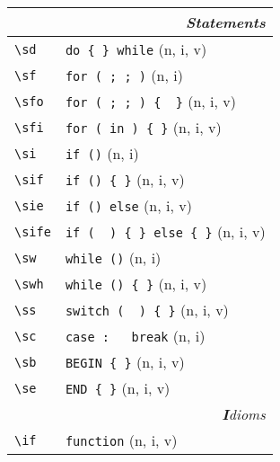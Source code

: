 \documentclass[oneside,10pt,landscape,DIV16]{scrartcl}
\begin{document}
\begin{multicols}{3}
\begin{center}
%
%
\begin{tabular}[]{|p{11mm}|p{60mm}|}
\hline
\multicolumn{2}{|r|}{\textsl{\textbf{S}tatements}}                    \\[1.0ex]
\hline \verb'\sd'      & \verb'do { } while'          \hfill (n, i, v)\\
\hline \verb'\sf'      & \verb'for ( ; ; )'           \hfill (n, i)\\
\hline \verb'\sfo'     & \verb'for ( ; ; ) {  }'      \hfill (n, i, v)\\
\hline \verb'\sfi'     & \verb'for ( in ) { }'        \hfill (n, i, v)\\
\hline \verb'\si'      & \verb'if ()'                 \hfill (n, i)\\
\hline \verb'\sif'     & \verb'if () { }'             \hfill (n, i, v)\\
\hline \verb'\sie'     & \verb'if () else'            \hfill (n, i, v)\\
\hline \verb'\sife'    & \verb'if (  ) { } else { }'  \hfill (n, i, v)\\
\hline \verb'\sw'      & \verb'while ()'              \hfill (n, i)\\
\hline \verb'\swh'     & \verb'while () { }'          \hfill (n, i, v)\\
\hline \verb'\ss'      & \verb'switch (  ) { }'       \hfill (n, i, v)\\
\hline \verb'\sc'      & \verb'case :	break'          \hfill (n, i)\\
\hline \verb'\sb'      & \verb'BEGIN { }'             \hfill (n, i, v)\\
\hline \verb'\se'      & \verb'END { }'               \hfill (n, i, v)\\
\hline
\hline
\multicolumn{2}{|r|}{\textsl{\textbf{I}dioms}}                 \\[1.0ex]
\hline \verb'\if' & \verb'function'            \hfill (n, i, v)\\
\hline
\hline

\end{tabular}
\end{center}
\end{multicols}
\end{document}
